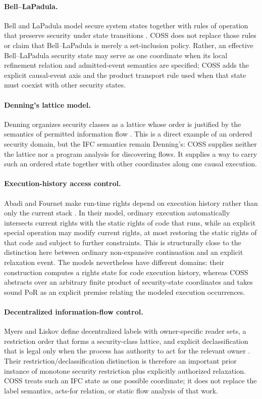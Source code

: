 \documentclass[10pt,twocolumn]{article}
\newcommand{\Model}{\textnormal{\textsc{COSS}}\xspace}
\begin{document}
\paragraph{Bell--LaPadula.}
Bell and LaPadula model secure system states together with rules of operation
that preserve security under state transitions \cite{bell_lapadula1973model}.
\Model does not replace those rules or claim that Bell--LaPadula is merely a
set-inclusion policy.  Rather, an effective Bell--LaPadula security state may
serve as one coordinate when its local refinement relation and admitted-event
semantics are specified; \Model adds the explicit causal-event axis and the
product transport rule used when that state must coexist with other security
states.

\paragraph{Denning's lattice model.}
Denning organizes security classes as a lattice whose order is justified by the
semantics of permitted information flow \cite{denning1976}.  This is a direct
example of an ordered security domain, but the IFC semantics remain Denning's:
\Model supplies neither the lattice nor a program analysis for discovering
flows.  It supplies a way to carry such an ordered state together with other
coordinates along one causal execution.

\paragraph{Execution-history access control.}
Abadi and Fournet make run-time rights depend on execution history rather than
only the current stack \cite{abadi_fournet2003}.  In their model, ordinary
execution automatically intersects current rights with the static rights of
code that runs, while an explicit special operation may modify current rights,
at most restoring the static rights of that code and subject to further
constraints.  This is structurally close to the distinction here
between ordinary non-expansive continuation and an explicit relaxation event.
The models nevertheless have different domains: their construction computes a
rights state for code execution history, whereas \Model abstracts over an
arbitrary finite product of security-state coordinates and takes sound PoR as
an explicit premise relating the modeled execution occurrences.

\paragraph{Decentralized information-flow control.}
Myers and Liskov define decentralized labels with owner-specific reader sets,
a restriction order that forms a security-class lattice, and explicit
declassification that is legal only when the process has authority to act for
the relevant owner \cite{myers_liskov1997}.  Their restriction/declassification
distinction is therefore an important prior instance of monotone security
restriction plus explicitly authorized relaxation.  \Model treats such an IFC
state as one possible coordinate; it does not replace the label semantics,
acts-for relation, or static flow analysis of that work.
\end{document}
